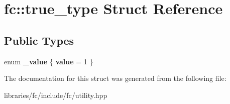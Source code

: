 \hypertarget{structfc_1_1true__type}{}\section{fc\+:\+:true\+\_\+type Struct Reference}
\label{structfc_1_1true__type}
\subsection*{Public Types}
\begin{DoxyCompactItemize}
\item 
\mbox{\label{structfc_1_1true__type_a7f5a50fffe136d090d061dee4afcdfe1}} 
enum {\bfseries \+\_\+value} \{ {\bfseries value} = 1
 \}
\end{DoxyCompactItemize}


The documentation for this struct was generated from the following file\+:\begin{DoxyCompactItemize}
\item 
libraries/fc/include/fc/utility.\+hpp\end{DoxyCompactItemize}
